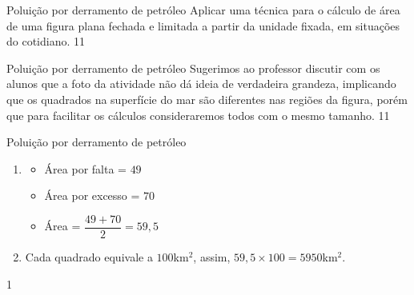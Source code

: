 \clearpage

\begin{objectives}{Poluição por derramento de petróleo}
{
  Aplicar uma técnica para o cálculo de área de uma figura plana fechada e limitada a partir da unidade fixada, em situações do cotidiano.
}{1}{1}
\end{objectives}
\begin{sugestions}{Poluição por derramento de petróleo}
{
  Sugerimos ao professor discutir com os alunos que a foto da atividade não dá ideia de verdadeira grandeza, implicando que os quadrados na superfície do mar são diferentes nas regiões da figura, porém que para facilitar os cálculos consideraremos todos com o mesmo tamanho.
}{1}{1}
\end{sugestions}
\begin{answer}{Poluição por derramento de petróleo}
{
  \begin{enumerate}
  \item 
  \begin{itemize}
  \item Área por falta = $49$
  \item Área por excesso = $70$
  \item Área = $\dfrac{49+70}{2}=59{,}5$
  \end{itemize}
  \item Cada quadrado equivale a $100$km$^2$, assim, $59{,}5\times100=5950$km$^2$.
  \end{enumerate}
}{1}
\end{answer}

